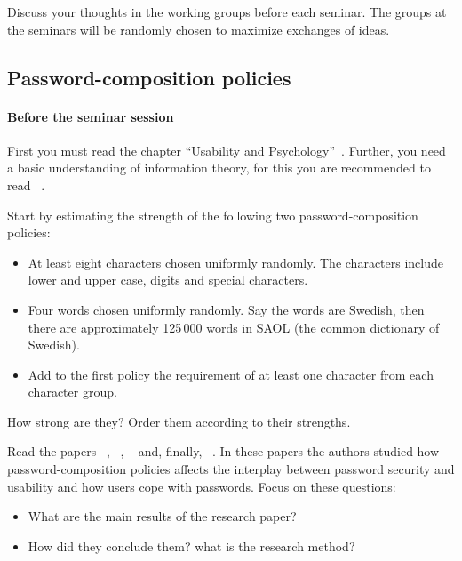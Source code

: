 Discuss your thoughts in the working groups before each seminar.
The groups at the seminars will be randomly chosen to maximize exchanges of 
ideas.

\subsection{Password-composition policies}%
\label{password-policies}

\paragraph{Before the seminar session}

First you must read the chapter \enquote{Usability and 
  Psychology}~\cite[Ch.~2]{Anderson2008sea}.
Further, you need a basic understanding of information theory, for this you are 
recommended to read ~\cite{Ueltschi2013se}.

Start by estimating the strength of the following two password-composition 
policies:
\begin{itemize}
  \item At least eight characters chosen uniformly randomly.
    The characters include lower and upper case, digits and special characters.

  \item Four words chosen uniformly randomly.
    Say the words are Swedish, then there are approximately 125\,000 words in 
    SAOL (the common dictionary of Swedish).

  \item Add to the first policy the requirement of at least one character from 
    each character group.
\end{itemize}
How strong are they?
Order them according to their strengths.

Read the papers
~\cite{OfPasswordsAndPeople}, 
~\cite{GuessAgainAndAgain},
~\cite{CanLongPasswordsBeSecureAndUsable} 
and, finally,
~\cite{PasswordLifeCycle}.
In these papers the authors studied how password-composition policies affects 
the interplay between password security and usability and how users cope with 
passwords.
Focus on these questions:
\begin{itemize}
  \item What are the main results of the research paper?
  \item How did they conclude them?
    \Ie what is the research method?
\end{itemize}

